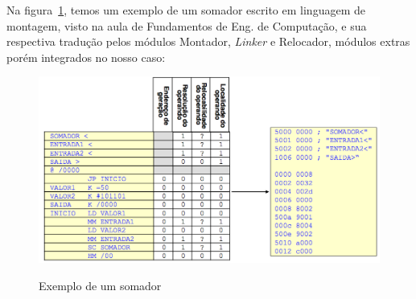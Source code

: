 Na figura~\ref{fig:exemplo-somador}, temos um exemplo de um somador escrito em linguagem de montagem, visto na aula de Fundamentos de Eng. de Computação, e sua respectiva tradução pelos módulos Montador, \emph{Linker} e Relocador, módulos extras porém integrados no nosso caso:

\begin{figure}[ht]
	\centering
	\caption{Exemplo de um somador}
	\includegraphics[width=\textwidth]{images/exemplo-somador.png}
	\label{fig:exemplo-somador}
\end{figure}

